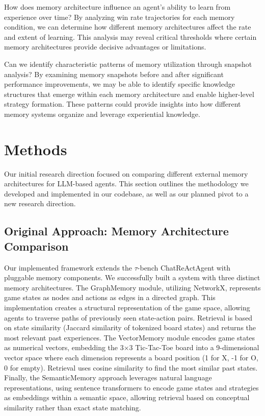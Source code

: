 \documentclass{article}
\begin{document}
How does memory architecture influence an agent's ability to learn from experience over time? By analyzing win rate trajectories for each memory condition, we can determine how different memory architectures affect the rate and extent of learning. This analysis may reveal critical thresholds where certain memory architectures provide decisive advantages or limitations.

Can we identify characteristic patterns of memory utilization through snapshot analysis? By examining memory snapshots before and after significant performance improvements, we may be able to identify specific knowledge structures that emerge within each memory architecture and enable higher-level strategy formation. These patterns could provide insights into how different memory systems organize and leverage experiential knowledge.

\section{Methods}

Our initial research direction focused on comparing different external memory architectures for LLM-based agents. This section outlines the methodology we developed and implemented in our codebase, as well as our planned pivot to a new research direction.

\subsection{Original Approach: Memory Architecture Comparison}

Our implemented framework extends the $\tau$-bench ChatReActAgent with pluggable memory components. We successfully built a system with three distinct memory architectures. The GraphMemory module, utilizing NetworkX, represents game states as nodes and actions as edges in a directed graph. This implementation creates a structural representation of the game space, allowing agents to traverse paths of previously seen state-action pairs. Retrieval is based on state similarity (Jaccard similarity of tokenized board states) and returns the most relevant past experiences. The VectorMemory module encodes game states as numerical vectors, embedding the 3×3 Tic-Tac-Toe board into a 9-dimensional vector space where each dimension represents a board position (1 for X, -1 for O, 0 for empty). Retrieval uses cosine similarity to find the most similar past states. Finally, the SemanticMemory approach leverages natural language representations, using sentence transformers to encode game states and strategies as embeddings within a semantic space, allowing retrieval based on conceptual similarity rather than exact state matching.
\end{document}
